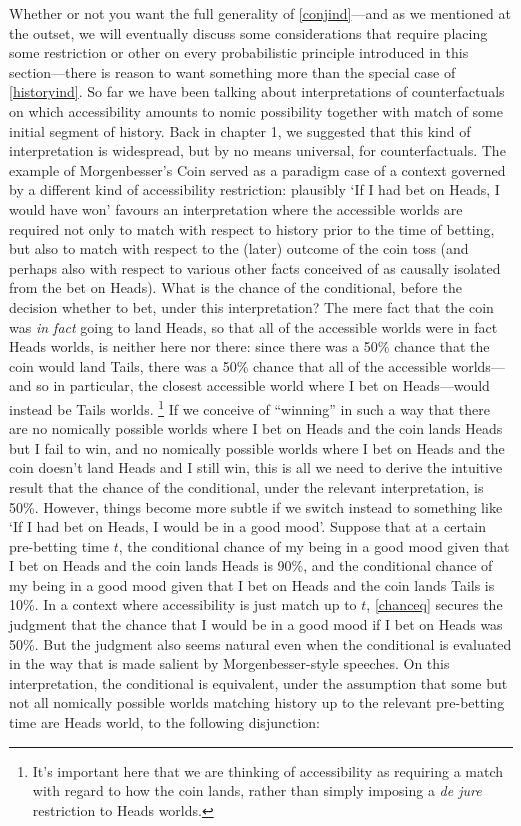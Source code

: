 \documentclass[If.tex]{subfiles}
\begin{document}
Whether or not you want the full generality of \ref{conjind}---and as we mentioned at the outset, we will eventually discuss some considerations that require placing some restriction or other on every probabilistic principle introduced in this section---there is reason to want something more than the special case of \ref{historyind}.  So far we have been talking about interpretations of counterfactuals on which accessibility amounts to nomic possibility together with match of some initial segment of history. Back in chapter 1, we suggested that this kind of interpretation is widespread, but by no means universal, for counterfactuals. The example of Morgenbesser's Coin served as a paradigm case of a context governed by a different kind of accessibility restriction: plausibly ‘If I had bet on Heads, I would have won’ favours an interpretation where the accessible worlds are required not only to match with respect to history prior to the time of betting, but also to match with respect to the (later) outcome of the coin toss (and perhaps also with respect to various other facts conceived of as causally isolated from the bet on Heads). What is the chance of the conditional, before the decision whether to bet, under this interpretation? The mere fact that the coin was \emph{in fact} going to land Heads, so that all of the accessible worlds were in fact Heads worlds, is neither here nor there: since there was a 50\% chance that the coin would land Tails, there was a 50\% chance that all of the accessible worlds---and so in particular, the closest accessible world where I bet on Heads---would instead be Tails worlds.%
\footnote{It's important here that we are thinking of accessibility as requiring a match with regard to how the coin lands, rather than simply imposing a \emph{de jure} restriction to Heads worlds.}
If we conceive of “winning” in such a way that there are no nomically possible worlds where I bet on Heads and the coin lands Heads but I fail to win, and no nomically possible worlds where I bet on Heads and the coin doesn't land Heads and I still win, this is all we need to derive the intuitive result that the chance of the conditional, under the relevant interpretation, is 50\%.  However, things become more subtle if we switch instead to something like ‘If I had bet on Heads, I would be in a good mood’. Suppose that at a certain pre-betting time $t$, the conditional chance of my being in a good mood given that I bet on Heads and the coin lands Heads is 90\%, and the conditional chance of my being in a good mood given that I bet on Heads and the coin lands Tails is 10\%.  In a context where accessibility is just match up to $t$, \ref{chanceq} secures the judgment that the chance that I would be in a good mood if I bet on Heads was 50\%.  But the judgment also seems natural even when the conditional is evaluated in the way that is made salient by Morgenbesser-style speeches.  On this interpretation, the conditional is equivalent, under the assumption that some but not all nomically possible worlds matching history up to the relevant pre-betting time are Heads world, to the following disjunction:
\end{document}
